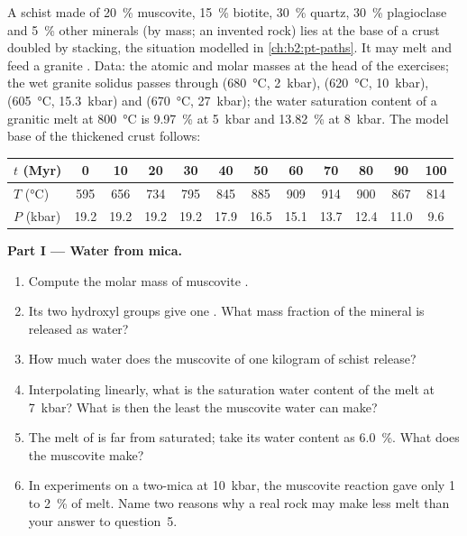\begin{problem}\label{pb:b2:crustal-melting:1}
A schist made of \qty{20}{\percent} muscovite, \qty{15}{\percent} biotite,
\qty{30}{\percent} quartz, \qty{30}{\percent} plagioclase and \qty{5}{\percent} other
minerals (by mass; an invented rock) lies at the base of a crust doubled by stacking, the
situation modelled in \cref{ch:b2:pt-paths}. It may melt and feed a granite . Data:
the atomic and molar masses at the head of the exercises; the wet granite solidus passes
through (\qty{680}{\celsius}, \qty{2}{kbar}), (\qty{620}{\celsius}, \qty{10}{kbar}),
(\qty{605}{\celsius}, \qty{15.3}{kbar}) and (\qty{670}{\celsius}, \qty{27}{kbar}); the
water saturation content of a granitic melt at \qty{800}{\celsius} is \qty{9.97}{\percent} at
\qty{5}{kbar} and \qty{13.82}{\percent} at \qty{8}{kbar}. The model base of the thickened crust follows:

\smallskip
\begin{center}\small
\begin{tabular}{l|ccccccccccc}
$t$ (\unit{Myr}) & 0 & 10 & 20 & 30 & 40 & 50 & 60 & 70 & 80 & 90 & 100\\ \hline
$T$ (\unit{\celsius}) & 595 & 656 & 734 & 795 & 845 & 885 & 909 & 914 & 900 & 867 & 814\\
$P$ (\unit{kbar}) & 19.2 & 19.2 & 19.2 & 19.2 & 17.9 & 16.5 & 15.1 & 13.7 & 12.4 & 11.0 & 9.6
\end{tabular}
\end{center}
\smallskip

\noindent\textbf{Part I --- Water from mica.}
\begin{enumerate}
\item Compute the molar mass of muscovite .
\item Its two hydroxyl groups give one . What mass fraction of the mineral is
released as water?
\item How much water does the muscovite of one kilogram of schist release?
\item Interpolating linearly, what is the saturation water content of the melt at
\qty{7}{kbar}? What is then the least  the muscovite water can make?
\item The melt of  is far from saturated; take its water content as
\qty{6.0}{\percent}. What  does the muscovite make?
\item In experiments on a two-mica  at \qty{10}{kbar}, the muscovite reaction
gave only 1 to \qty{2}{\percent} of melt. Name two reasons why a real rock may make less
melt than your answer to question~5.
\end{enumerate}


\end{problem}
